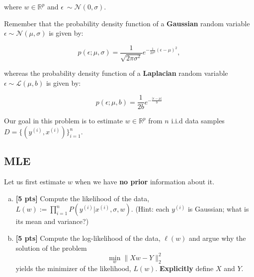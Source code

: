\documentclass{article}
\newenvironment{soln}{
	\leavevmode\color{blue}\ignorespaces
}{}
\begin{document}
where $w \in \mathbb{R}^p$ and $\epsilon ~\sim \mathcal{N}(0, \sigma)$.

Remember that the probability density function of a \textbf{Gaussian} random variable $\epsilon \sim \mathcal{N}(\mu, \sigma)$ is given by:

\begin{equation}
  p(\epsilon; \mu, \sigma) = \frac{1}{\sqrt{2\pi\sigma^2}}e^{-\frac{1}{2\sigma^2}(\epsilon-\mu)^2},
\end{equation}

whereas the probability density function of a \textbf{Laplacian} random variable $\epsilon \sim \mathcal{L}(\mu, b)$ is given by:

\begin{equation}
  p(\epsilon; \mu, b) = \frac{1}{2b}e^{-\frac{\lvert \epsilon -\mu \rvert}{b}}
\end{equation}

Our goal in this problem is to estimate $w \in \mathbb{R}^p$ from $n$ i.i.d data samples $D=\{(y^{(i)}, x^{(i)})\}_{i=1}^n$.

\subsection{MLE}
Let us first estimate $w$ when we have \textbf{no prior} information about it.

\begin{enumerate}[(a)]
  \item \textbf{[5 pts]} Compute the likelihood of the data, $L(w) := \prod_{i=1}^{n}P(y^{(i)}|x^{(i)},\sigma,w)$. (Hint: each $y^{(i)}$ is Gaussian; what is its mean and variance?)
  
  \begin{soln}

  \end{soln}
  
  \item \textbf{[5 pts]} Compute the log-likelihood of the data, $\ell(w)$ and argue why the solution of the problem
    \begin{equation}
      \min_{w} \lVert Xw - Y \rVert_2^2
    \end{equation}
   yields the minimizer of the likelihood, $L(w)$. \textbf{Explicitly} define $X$ and $Y$.
   
  \begin{soln}
  	
  \end{soln}
  
\end{enumerate}
\end{document}
